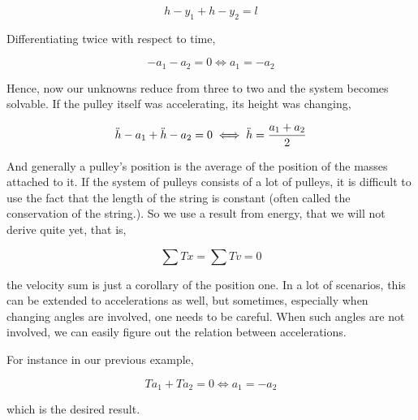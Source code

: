 \begin{equation*}
    h - y_1 + h - y_2 = l
\end{equation*}

Differentiating twice with respect to time, 

\begin{equation*}
    - a_1 - a_2 = 0 \iff a_1 = -a_2
\end{equation*}

Hence, now our unknowns reduce from three to two and the system becomes solvable.
If the pulley itself was accelerating, its height was changing,

\begin{equation*}
    \ddot{h} - a_1 + \ddot{h} - a_2 = 0 \iff \ddot{h} = \frac{a_1 + a_2}{2}
\end{equation*}

And generally a pulley's position is the average of the position of the masses attached to it.
If the system of pulleys consists of a lot of pulleys, it is difficult to use 
the fact that the length of the string is constant (often called the conservation of 
the string.). So we use a result from energy, that we will not derive quite yet, that is,

\begin{equation*}
    \sum Tx = \sum Tv = 0
\end{equation*}

the velocity sum is just a corollary of the position one. In a lot of scenarios, 
this can be extended to accelerations as well, but sometimes, especially when 
changing angles are involved, one needs to be careful. When such angles are not 
involved, we can easily figure out the relation between accelerations. 

For instance in our previous example,

\begin{equation*}
    Ta_1 + Ta_2 = 0 \iff a_1 = -a_2
\end{equation*}

which is the desired result.

